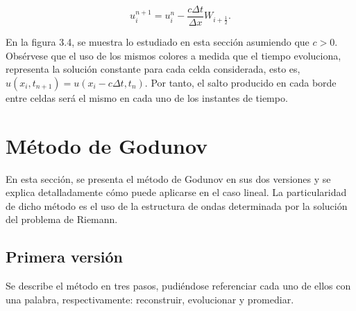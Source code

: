 \begin{equation*}
    u^{n+1}_{i}=
    u^{n}_{i}-
    \frac{c\Delta t}{\Delta x}
    W_{i+\frac{1}{2}}.
\end{equation*}

En la figura 3.4, se muestra lo estudiado en esta sección asumiendo que $c>0$.
Obsérvese que el uso de los mismos colores a medida que el tiempo
evoluciona, representa la solución constante para cada celda considerada, esto es,
\begin{math}
    u
    \left(
    x_{i},
    t_{n+1}
    \right)=
    u
    \left(
    x_{i}-c\Delta t,
    t_{n}
    \right)
\end{math}.
Por tanto, el salto producido en cada borde entre celdas será el mismo en
cada uno de los instantes de tiempo.

\section{Método de Godunov}

En esta sección, se presenta el método de Godunov en sus dos versiones y se explica
detalladamente cómo puede aplicarse en el caso lineal. La particularidad de dicho método
es el uso de la estructura de ondas determinada por la solución del problema de Riemann.

\subsection{Primera versión}

Se describe el método en tres pasos, pudiéndose referenciar cada uno de ellos con una
palabra, respectivamente: reconstruir, evolucionar y promediar.

